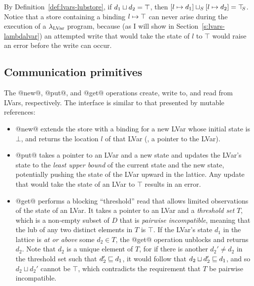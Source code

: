 \LVarsDefEqStore

By Definition~\ref{def:lvars-lubstore}, if $d_1 \sqcup d_2 =
\top$, then
$\left[ l \mapsto d_1 \right] \sqcup_{S} \left[ l \mapsto d_2 \right]
= \top\hspace{-0.85mm}_{S}$.  Notice that a store containing a binding
$l \mapsto \top$ can never arise during the execution of a
$\lambda_{\textrm{LVar}}$ program, because (as I will show in
Section~\ref{s:lvars-lambdalvar}) an attempted write that would take
the state of $l$ to $\top$ would raise an error before the write can
occur.

\subsection{Communication primitives}\label{subsection:lvars-communication-primitives}

The @new@, @put@, and @get@ operations create, write to, and read
from LVars, respectively. The interface is similar to that presented
by mutable references:

\begin{itemize}
\item @new@ extends the store with a binding for a new LVar whose
  initial state is $\bot$, and returns the location $l$ of that LVar
  (\ie, a pointer to the LVar).
\item @put@ takes a pointer to an LVar and a new state and updates the
  LVar's state to the \emph{least upper bound} of the current state
  and the new state, potentially pushing the state of the LVar upward
  in the lattice.  Any update that would take the state of an LVar to
  $\top$ results in an error.
\item @get@ performs a blocking ``threshold'' read that allows limited
  observations of the state of an LVar.  It takes a pointer to an LVar
  and a \emph{threshold set} $T$, which is a non-empty subset of $D$
  that is \emph{pairwise incompatible}, meaning that the lub of any
  two distinct elements in $T$ is $\top$.  If the LVar's state $d_1$
  in the lattice is \emph{at or above} some $d_2 \in T$, the @get@
  operation unblocks and returns $d_2$.  Note that $d_2$ is a unique
  element of $T$, for if there is another $d_2' \neq d_2$ in the
  threshold set such that $d_2' \sqsubseteq d_1$, it would follow that
  $d_2 \sqcup d_2' \sqsubseteq d_1$, and so $d_2 \sqcup d_2'$ cannot be
  $\top$, which contradicts the requirement that $T$ be pairwise
  incompatible.
\end{itemize}

